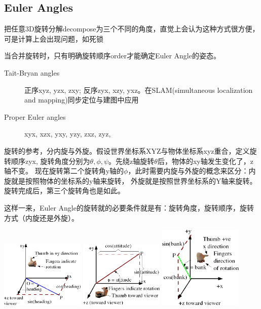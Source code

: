 \subsection{Euler Angles}
把任意3D旋转分解decompose为三个不同的角度，直觉上会认为这种方式很方便，可是计算上会出现问题，如死锁


当合并旋转时，只有明确旋转顺序order才能确定Euler Angle的姿态。
\begin{description}
    \item [Tait-Bryan angles] \textsf{正序xyz, yzx, zxy; 反序zyx, xzy, yxz。在SLAM(simultaneous localization and mapping)同步定位与建图中应用}
    \item [Proper Euler angles] \textsf{xyx, xzx, yxy, yzy, zxz, zyz,}
\end{description}

旋转的参考，分内旋与外旋。假设世界坐标系XYZ与物体坐标系xyz重合，定义旋转顺序zyx,
旋转角度分别为$\theta, \phi, \psi$。先绕z轴旋转$\theta$后，物体的xy轴发生变化了，z轴不变。
现在旋转第二个旋转角y轴的$\phi$，此时需要内旋与外旋的概念来区分：内旋就是按照物体的坐标系的y轴来旋转，
外旋就是按照世界坐标系的Y轴来旋转。
旋转完成后，第三个旋转角也是如此。

这样一来，Euler Angle的旋转就的必要条件就是有：旋转角度，旋转顺序，旋转方式（内旋还是外旋）。

\begin{center}
    \includegraphics[width=0.3\textwidth]{images/heading.png}
    \includegraphics[width=0.3\textwidth]{images/attitude.png}
    \includegraphics[width=0.3\textwidth]{images/bank.png}
\end{center}

